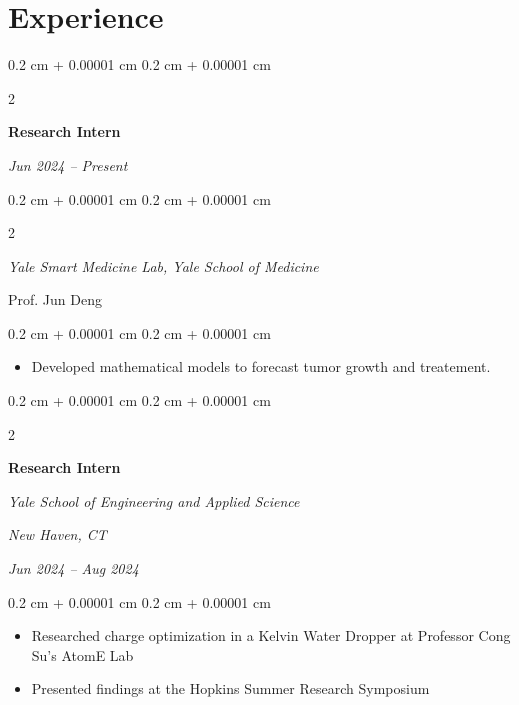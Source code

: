 \documentclass[10pt, letterpaper]{article}
\newenvironment{highlights}{
    \begin{itemize}[
        topsep=0.10 cm,
        parsep=0.10 cm,
        partopsep=0pt,
        itemsep=0pt,
        leftmargin=0.4 cm + 10pt
    ]
}{
    \end{itemize}
} %
\newenvironment{onecolentry}{
    \begin{adjustwidth}{
        0.2 cm + 0.00001 cm
    }{
        0.2 cm + 0.00001 cm
    }
}{
    \end{adjustwidth}
} %
\newenvironment{twocolentry}[2][]{
    \onecolentry
    \def\secondColumn{#2}
    \setcolumnwidth{\fill, 4.5 cm}
    \begin{paracol}{2}
}{
    \switchcolumn \raggedleft \secondColumn
    \end{paracol}
    \endonecolentry
} %
\begin{document}
    \section{Experience}

        \begin{twocolentry}{
            \textit{Jun 2024 – Present}}
            \textbf{Research Intern}
        \end{twocolentry}
        \begin{twocolentry}
            {Prof. Jun Deng}
            {\textit{Yale Smart Medicine Lab, Yale School of Medicine}}
        
        \end{twocolentry}

        \vspace{0.10 cm}
        
        \begin{onecolentry}
            \begin{highlights}
                \item Developed mathematical models to forecast tumor growth and treatement.
            \end{highlights}
        \end{onecolentry}

        \vspace{0.2 cm}


         \begin{twocolentry}{
        \textit{New Haven, CT}    
            
        \textit{Jun 2024 – Aug 2024}}
            \textbf{Research Intern}
            
            \textit{Yale School of Engineering and Applied Science}
        \end{twocolentry}

        \vspace{0.10 cm}
        
        \begin{onecolentry}
            \begin{highlights}
                \item Researched charge optimization in a Kelvin Water Dropper at Professor Cong Su’s AtomE Lab
                \item Presented findings at the Hopkins Summer Research Symposium
            \end{highlights}
        \end{onecolentry}

        \vspace{0.2 cm}
\end{document}
